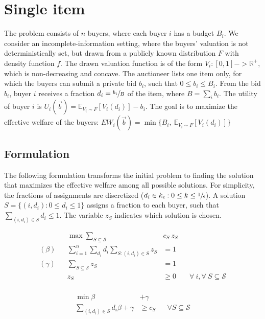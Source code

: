 
\section{Single item}

The problem consists of $n$ buyers, where each buyer $i$ has a budget $B_i$.
We consider an incomplete-information setting, where the buyers' valuation is not deterministically set, but drawn from a publicly known distribution $F$ with density function $f$. The drawn valuation function is of the form $V_i : [0,1] -> \mathbb{R}^+$, which is non-decreasing and concave. The auctioneer lists one item only, for which the buyers can submit a private bid $b_i$, such that $0 \le b_i \le B_i$. From the bid $b_i$, buyer $i$ receives a fraction $d_i = \sfrac{b_i}{B}$ of the item, where $B = \sum_i b_i$. The utility of buyer $i$ is $U_i(\vec{b}) = \mathbb{E}_{V_i \sim F}[V_i(d_i)] - b_i$. The goal is to maximize the effective welfare of the buyers: $EW_i(\vec{b}) = \min\{B_i,\  \mathbb{E}_{V_i \sim F}[V_i(d_i)]\}$

\subsection{Formulation}

The following formulation transforms the initial problem to finding the solution that maximizes the effective welfare among all possible solutions. For simplicity, the fractions of assignments are discretized ($d_i \in k_{\epsilon} : 0 \le k \le \sfrac{1}{\epsilon}$). A solution $S = \{(i, d_i) : 0 \le d_i \le 1\}$ assigns a fraction to each buyer, such that $\sum_{(i,d_{i}) \in S} d_{i} \le 1$. The variable $z_S$ indicates which solution is chosen.

\begin{minipage}[t]{0.59\textwidth}
	\begin{align*}
		&& \max  \sum_{S \subseteq \mathcal{S}} &c_{S}\ z_{S} \\
		(\beta) && \sum_{i=1}^{n} \sum_{d_{i}} d_{i} \sum_{S: (i,d_{i}) \in S } z_{S} &= 1 & & \\
		(\gamma) && \sum_{S \subseteq \mathcal{S}} z_{S}  &= 1	& & \\
		&& z_{S} &\geq 0 & & \forall\ i, \forall\ S \subseteq \mathcal{S}\\
	\end{align*}
\end{minipage}
\begin{minipage}[t]{0.3\textwidth}
	\begin{align*}
		\min \beta &+ \gamma \\
		\sum_{(i,d_{i}) \in S} d_{i} \beta + \gamma &\geq c_{S}  & & \forall S \subseteq \mathcal{S}\\
\end{align*}
\end{minipage}


